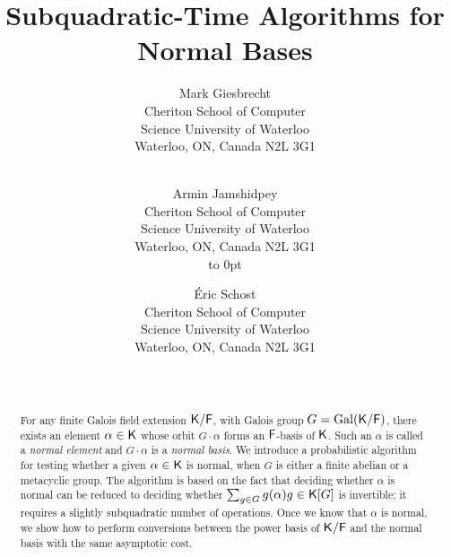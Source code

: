 \contact{}%
\submitted{}%
\title{Subquadratic-Time Algorithms for Normal Bases}%
\titlehead{Normal Bases}%
\author{
Mark Giesbrecht \\
Cheriton School of Computer\\ Science
University of Waterloo\\ 
Waterloo, ON, Canada  N2L 3G1 \\
\\
\and 
Armin Jamshidpey\\
Cheriton School of Computer\\ Science
University of Waterloo\\ 
Waterloo, ON, Canada  N2L 3G1 \\
\hbox to 0pt{}\\
\and 
\'Eric Schost \\
Cheriton School of Computer\\ Science
University of Waterloo\\ 
Waterloo, ON, Canada  N2L 3G1 \\
\\
\\
}
\begin{abstract}
  For any finite Galois field extension ${\mathsf{K}}/{\mathsf{F}}$, with Galois group $G
  = \mathrm{Gal}({\mathsf{K}}/{\mathsf{F}})$, there exists an element $\alpha \in {\mathsf{K}}$
  whose orbit $G\cdot\alpha$ forms an ${\mathsf{F}}$-basis of ${\mathsf{K}}$. Such an
  $\alpha$ is called a \emph{normal element} and $G\cdot\alpha$ is a
  \emph{normal basis}. We introduce a probabilistic algorithm for
  testing whether a given $\alpha \in {\mathsf{K}}$ is normal, when $G$ is
  either a finite abelian or a metacyclic group.  The algorithm is
  based on the fact that deciding whether $\alpha$ is normal can be
  reduced to deciding whether $\sum_{g \in G} g(\alpha)g \in {\mathsf{K}}[G]$ is
  invertible; it requires a slightly subquadratic number of
  operations. Once we know that $\alpha$ is normal, we show how to
  perform conversions between the power basis of ${\mathsf{K}}/{\mathsf{F}}$ and the
  normal basis with the same asymptotic cost.
\end{abstract}

